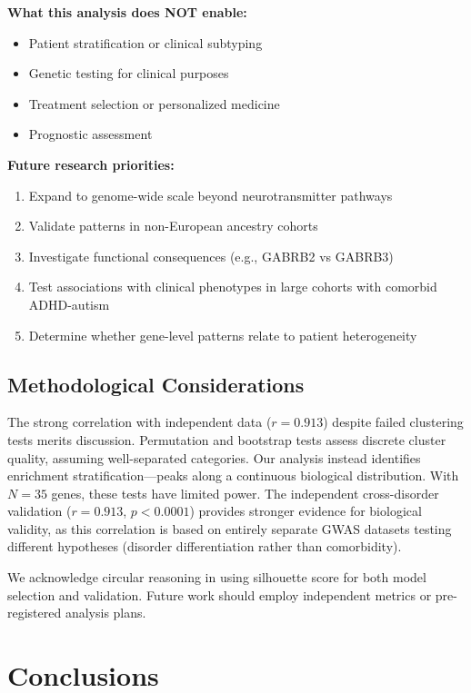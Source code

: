 \documentclass[12pt,letterpaper]{article}
\theoremstyle{definition}
\theoremstyle{remark}
\begin{document}
\textbf{What this analysis does NOT enable:}
\begin{itemize}
    \item Patient stratification or clinical subtyping
    \item Genetic testing for clinical purposes
    \item Treatment selection or personalized medicine
    \item Prognostic assessment
\end{itemize}

\textbf{Future research priorities:}
\begin{enumerate}
    \item Expand to genome-wide scale beyond neurotransmitter pathways
    \item Validate patterns in non-European ancestry cohorts
    \item Investigate functional consequences (e.g., GABRB2 vs GABRB3)
    \item Test associations with clinical phenotypes in large cohorts with comorbid ADHD-autism
    \item Determine whether gene-level patterns relate to patient heterogeneity
\end{enumerate}

\subsection{Methodological Considerations}

The strong correlation with independent data ($r=0.913$) despite failed clustering tests merits discussion. Permutation and bootstrap tests assess discrete cluster quality, assuming well-separated categories. Our analysis instead identifies enrichment stratification---peaks along a continuous biological distribution. With $N=35$ genes, these tests have limited power. The independent cross-disorder validation ($r=0.913$, $p<0.0001$) provides stronger evidence for biological validity, as this correlation is based on entirely separate GWAS datasets testing different hypotheses (disorder differentiation rather than comorbidity).

We acknowledge circular reasoning in using silhouette score for both model selection and validation. Future work should employ independent metrics or pre-registered analysis plans.

\section{Conclusions}
\end{document}
